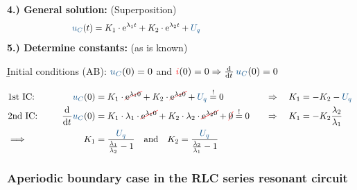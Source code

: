 %
\begin{frame}\ftx{\subsubsecname}%
    \textbf{4.) General solution:} (Superposition)%
    \begin{align}
        &&
            \ecv{u_C}(t) &= K_1 \cdot \mathrm{e}^{\lambda_1 t} + K_2 \cdot \mathrm{e}^{\lambda_2 t} + \ecv{U_q} \nonumber\\[-14pt]
        &\hphantom{1Rooooooo}&\hphantom{2Loooooo}&\hphantom{2Roooooooooooooooooooooooooooooooooo}&\hphantom{3Loooooo}&\hphantom{3Roooooooooo} \nonumber %
    \end{align}
    \pause%
    \textbf{5.) Determine constants:} (as is known)

    \b{\vspace{4pt}Initial conditions (AB): $\ecv{u_C}(0)=0$ and $\eci{i}(0)=0 \Rightarrow \dt\, \ecv{u_C}(0) = 0 $}

    \begin{align*}
        &\hphantom{1Rooooooo}&\hphantom{2Loooooo}&\hphantom{2Roooooooooooooooooooooooooooooooooo}&\hphantom{3Loooooo}&\hphantom{3Roooooooooo}\\[-15pt] %
        &\text{1st IC:}&
            \ecv{u_C}(0) &= K_1 \cdot \redcancel{\mathrm{e}^{\lambda_1 0}} + K_2 \cdot \redcancel{\mathrm{e}^{\lambda_2 0}} + \ecv{U_q} \overset{!}{=} 0 & \Rightarrow\quad K_1 &= -K_2 -\ecv{U_q}\\
        &\text{2nd IC:}&
            \dt \ecv{u_C}(0) &= K_1 \cdot \lambda_1 \cdot \redcancel{\mathrm{e}^{\lambda_1 0}} + K_2 \cdot \lambda_2 \cdot \redcancel{\mathrm{e}^{\lambda_2 0}} + \redcancel{0} \overset{!}{=} 0 &  \Rightarrow\quad K_1 &= - K_2 \frac{\lambda_2}{\lambda_1} \nonumber\\
        &\Longrightarrow&
            K_1 &=  \frac{\ecv{U_q}}{\frac{\lambda_1}{\lambda_2}-1} \quad\text{and}\quad
                K_2 = \frac{\ecv{U_q}}{\frac{\lambda_2}{\lambda_1}-1}
    \end{align*}

\end{frame}


\subsubsection[Aperiodischer Grenzfall]{Aperiodic boundary case in the RLC series resonant circuit}
\label{sec:schaltvorgaengezeitbereich:rlc:grenzfall}

